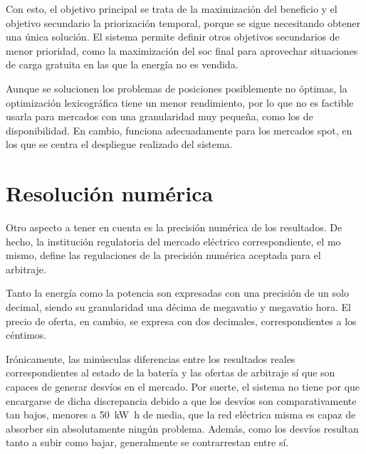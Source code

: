 Con esto, el objetivo principal se trata de la maximización del beneficio y el objetivo secundario la priorización temporal, porque se sigue necesitando obtener una única solución. El sistema permite definir otros objetivos secundarios de menor prioridad, como la maximización del \gls{soc} final para aprovechar situaciones de carga gratuita en las que la energía no es vendida.

Aunque se solucionen los problemas de posiciones posiblemente no óptimas, la optimización lexicográfica tiene un menor rendimiento, por lo que no es factible usarla para mercados con una granularidad muy pequeña, como los de disponibilidad. En cambio, funciona adecuadamente para los mercados spot, en los que se centra el despliegue realizado del sistema.

\section{Resolución numérica}%
\label{makereference5.4}

Otro aspecto a tener en cuenta es la precisión numérica de los resultados. De hecho, la institución regulatoria del mercado eléctrico correspondiente, el \gls{mo} mismo, define las regulaciones de la precisión numérica aceptada para el arbitraje.

Tanto la energía como la potencia son expresadas con una precisión de un solo decimal, siendo su granularidad una décima de megavatio y megavatio hora. El precio de oferta, en cambio, se expresa con dos decimales, correspondientes a los céntimos.

Irónicamente, las minúsculas diferencias entre los resultados reales correspondientes al estado de la batería y las ofertas de arbitraje sí que son capaces de generar desvíos en el mercado. Por suerte, el sistema no tiene por que encargarse de dicha discrepancia debido a que los desvíos son comparativamente tan bajos, menores a \SI{50}{{\kilo\watt\hour}} de media, que la red eléctrica misma es capaz de absorber sin absolutamente ningún problema. Además, como los desvíos resultan tanto a subir como bajar, generalmente se contrarrestan entre sí.
